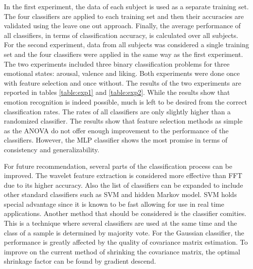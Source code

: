 \documentclass[12pt, a4paper, fleqn]{memoir}%
\begin{document}
In the first experiment, the data of each subject is used as a separate training set. The four classifiers are applied to each training set and then their accuracies are validated using the leave one out approach. Finally, the average performance of all classifiers, in terms of classification accuracy, is calculated over all subjects. For the second experiment, data from all subjects was considered a single training set and the four classifiers were applied in the same way as the first experiment. The two experiments included three binary classification problems for three emotional states: arousal, valence and liking. Both experiments were done once with feature selection and once without. The results of the two experiments are reported in tables \ref{table:exp1} and \ref{table:exp2}. While the results show that emotion recognition is indeed possible, much is left to be desired from the correct classification rates. The rates of all classifiers are only slightly higher than a randomized classifier. The results show that feature selection methods as simple as the ANOVA do not offer enough improvement to the performance of the classifiers. However, the MLP classifier shows the most promise in terms of consistency and generalizability.

For future recommendation, several parts of the classification process can be improved. The wavelet feature extraction is considered more effective than FFT due to its higher accuracy. Also the list of classifiers can be expanded to include other standard classifiers such as SVM and hidden Markov model. SVM holds special advantage since it is known to be fast allowing for use in real time applications. Another method that should be considered is the classifier comities. This is a technique where several classifiers are used at the same time and the class of a sample is determined by majority vote. For the Gaussian classifier, the performance is greatly affected by the quality of covariance matrix estimation. To improve on the current method of shrinking the covariance matrix, the optimal shrinkage factor can be found by gradient descend. 

\small{}


\appendix
\appendixpage*
\end{document}
